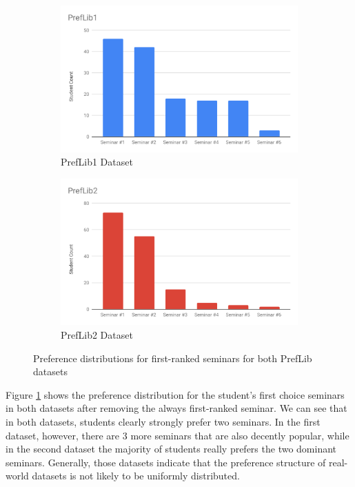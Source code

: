 \begin{figure}[h!]
  \centering
  \begin{subfigure}[b]{0.49\linewidth}
    \includegraphics[width=\linewidth]{assets/plots/preflib1-distr.pdf}
    \caption{PrefLib1 Dataset}
  \end{subfigure}
  \begin{subfigure}[b]{0.49\linewidth}
    \includegraphics[width=\linewidth]{assets/plots/preflib2-distr.pdf}
    \caption{PrefLib2 Dataset}
  \end{subfigure}
  \caption{Preference distributions for first-ranked seminars for both PrefLib datasets}
  \label{fig:preflib-distribution}
\end{figure}

Figure \ref{fig:preflib-distribution} shows the preference distribution for the student's first choice seminars in both datasets after removing the always first-ranked seminar. We can see that in both datasets, students clearly strongly prefer two seminars. In the first dataset, however, there are 3 more seminars that are also decently popular, while in the second dataset the majority of students really prefers the two dominant seminars. Generally, those datasets indicate that the preference structure of real-world datasets is not likely to be uniformly distributed.

